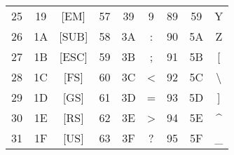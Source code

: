 \documentclass[12pt]{article}
\begin{document}
\begin{table}[H]
{\begin{tabular}{| c | c | c | c | c | c | c | c | c |}
    25 & 19 & [EM] & 57 & 39 & 9 & 89 & 59 & Y \\
    26 & 1A & [SUB] & 58 & 3A & : & 90 & 5A & Z \\
    27 & 1B & [ESC] & 59 & 3B & ; & 91 & 5B & [ \\
    28 & 1C & [FS] & 60 & 3C & < & 92 & 5C & \textbackslash \\
    29 & 1D & [GS] & 61 & 3D & = & 93 & 5D & ] \\
    30 & 1E & [RS] & 62 & 3E & > & 94 & 5E & \textasciicircum \\
    31 & 1F & [US] & 63 & 3F & ? & 95 & 5F & \_ \\
    \hline
    \end{tabular}

}
\end{table}
\end{document}
